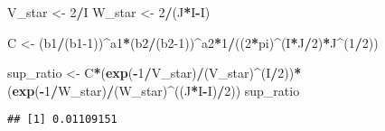 \documentclass[
]{article}
\newenvironment{Shaded}{\begin{snugshade}}{\end{snugshade}}
\newcommand{\DecValTok}[1]{\textcolor[rgb]{0.00,0.00,0.81}{#1}}
\newcommand{\FunctionTok}[1]{\textcolor[rgb]{0.13,0.29,0.53}{\textbf{#1}}}
\newcommand{\NormalTok}[1]{#1}
\newcommand{\OtherTok}[1]{\textcolor[rgb]{0.56,0.35,0.01}{#1}}
\newcommand{\SpecialCharTok}[1]{\textcolor[rgb]{0.81,0.36,0.00}{\textbf{#1}}}
\begin{document}
\begin{Shaded}
\begin{Highlighting}[]
\NormalTok{V\_star }\OtherTok{\textless{}{-}} \DecValTok{2}\SpecialCharTok{/}\NormalTok{I}
\NormalTok{W\_star }\OtherTok{\textless{}{-}} \DecValTok{2}\SpecialCharTok{/}\NormalTok{(J}\SpecialCharTok{*}\NormalTok{I}\SpecialCharTok{{-}}\NormalTok{I)}

\NormalTok{C }\OtherTok{\textless{}{-}}\NormalTok{ (b1}\SpecialCharTok{/}\NormalTok{(b1}\DecValTok{{-}1}\NormalTok{))}\SpecialCharTok{\^{}}\NormalTok{a1}\SpecialCharTok{*}\NormalTok{(b2}\SpecialCharTok{/}\NormalTok{(b2}\DecValTok{{-}1}\NormalTok{))}\SpecialCharTok{\^{}}\NormalTok{a2}\SpecialCharTok{*}\DecValTok{1}\SpecialCharTok{/}\NormalTok{((}\DecValTok{2}\SpecialCharTok{*}\NormalTok{pi)}\SpecialCharTok{\^{}}\NormalTok{(I}\SpecialCharTok{*}\NormalTok{J}\SpecialCharTok{/}\DecValTok{2}\NormalTok{)}\SpecialCharTok{*}\NormalTok{J}\SpecialCharTok{\^{}}\NormalTok{(}\DecValTok{1}\SpecialCharTok{/}\DecValTok{2}\NormalTok{))}

\NormalTok{sup\_ratio }\OtherTok{\textless{}{-}}\NormalTok{ C}\SpecialCharTok{*}\NormalTok{(}\FunctionTok{exp}\NormalTok{(}\SpecialCharTok{{-}}\DecValTok{1}\SpecialCharTok{/}\NormalTok{V\_star)}\SpecialCharTok{/}\NormalTok{(V\_star)}\SpecialCharTok{\^{}}\NormalTok{(I}\SpecialCharTok{/}\DecValTok{2}\NormalTok{))}\SpecialCharTok{*}\NormalTok{(}\FunctionTok{exp}\NormalTok{(}\SpecialCharTok{{-}}\DecValTok{1}\SpecialCharTok{/}\NormalTok{W\_star)}\SpecialCharTok{/}\NormalTok{(W\_star)}\SpecialCharTok{\^{}}\NormalTok{((J}\SpecialCharTok{*}\NormalTok{I}\SpecialCharTok{{-}}\NormalTok{I)}\SpecialCharTok{/}\DecValTok{2}\NormalTok{))}
\NormalTok{sup\_ratio}
\end{Highlighting}
\end{Shaded}

\begin{verbatim}
## [1] 0.01109151
\end{verbatim}
\end{document}
